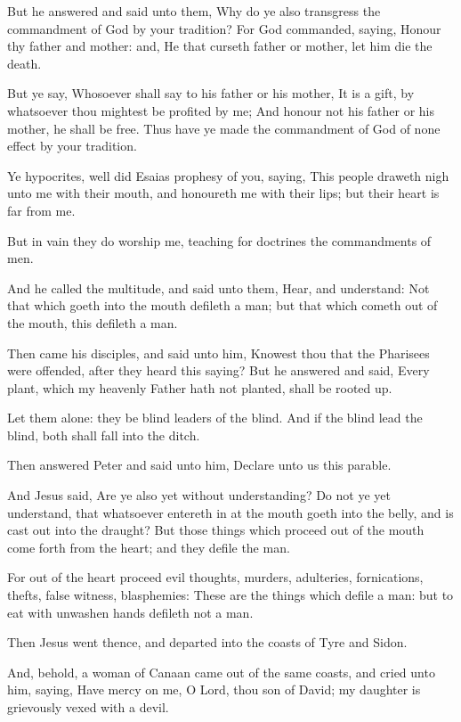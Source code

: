 \verse But he answered and said unto them, Why do ye also transgress the commandment of God by your tradition?  \verse For God commanded, saying, Honour thy father and mother: and, He that curseth father or mother, let him die the death.

\verse But ye say, Whosoever shall say to his father or his mother, It is a gift, by whatsoever thou mightest be profited by me; \verse And honour not his father or his mother, he shall be free. Thus have ye made the commandment of God of none effect by your tradition.

\verse Ye hypocrites, well did Esaias prophesy of you, saying, \verse This people draweth nigh unto me with their mouth, and honoureth me with their lips; but their heart is far from me.

\verse But in vain they do worship me, teaching for doctrines the commandments of men.

\verse And he called the multitude, and said unto them, Hear, and understand: \verse Not that which goeth into the mouth defileth a man; but that which cometh out of the mouth, this defileth a man.

\verse Then came his disciples, and said unto him, Knowest thou that the Pharisees were offended, after they heard this saying?  \verse But he answered and said, Every plant, which my heavenly Father hath not planted, shall be rooted up.

\verse Let them alone: they be blind leaders of the blind. And if the blind lead the blind, both shall fall into the ditch.

\verse Then answered Peter and said unto him, Declare unto us this parable.

\verse And Jesus said, Are ye also yet without understanding?  \verse Do not ye yet understand, that whatsoever entereth in at the mouth goeth into the belly, and is cast out into the draught?  \verse But those things which proceed out of the mouth come forth from the heart; and they defile the man.

\verse For out of the heart proceed evil thoughts, murders, adulteries, fornications, thefts, false witness, blasphemies: \verse These are the things which defile a man: but to eat with unwashen hands defileth not a man.

\verse Then Jesus went thence, and departed into the coasts of Tyre and Sidon.

\verse And, behold, a woman of Canaan came out of the same coasts, and cried unto him, saying, Have mercy on me, O Lord, thou son of David; my daughter is grievously vexed with a devil.

